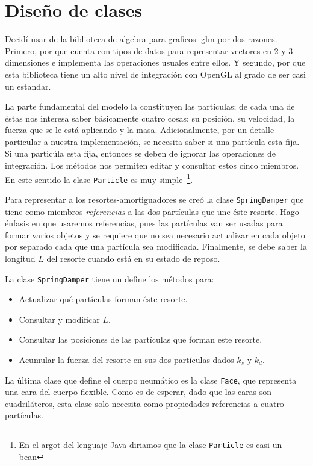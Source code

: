 \section{Diseño de clases}

Decidí usar de la biblioteca de algebra para graficos: \href{http://github.com/g-truc/glm}{glm} por dos razones.
Primero, por que cuenta con tipos de datos para representar vectores en 2 y 3 dimensiones e implementa las operaciones usuales entre ellos.
Y segundo, por que esta biblioteca tiene un alto nivel de integración con OpenGL al grado de ser casi un estandar.

La parte fundamental del modelo la constituyen las partículas; de cada una de éstas nos interesa saber básicamente cuatro cosas: su posición, su velocidad, la fuerza que se le está aplicando y la masa.
Adicionalmente, por un detalle particular a nuestra implementación, se necesita saber si una partícula esta fija.
Si una particúla esta fija, entonces se deben de ignorar las operaciones de integración.
Los métodos nos permiten editar y consultar estos cinco miembros. En este sentido la clase \texttt{Particle} es muy simple~\footnote{En el argot del lenguaje \href{http://www.java.com/en/}{Java} diriamos que la clase \texttt{Particle} es casi un \href{http://en.wikipedia.org/wiki/JavaBeans}{bean}}.

Para representar a los resortes-amortiguadores se creó la clase \texttt{SpringDamper} que tiene como miembros \emph{referencias} a las dos partículas que une éste resorte.
Hago énfasis en que usaremos referencias, pues las partículas van ser usadas para formar varios objetos y se requiere que no sea necesario actualizar en cada objeto por separado cada que una partícula sea modificada. Finalmente, se debe saber la longitud $L$ del resorte cuando está en su estado de reposo.

La clase \texttt{SpringDamper} tiene un define los métodos para:
\begin{itemize}
 \item Actualizar qué partículas forman éste resorte.
 \item Consultar y modificar $L$.
 \item Consultar las posiciones de las partículas que forman este resorte.
 \item Acumular la fuerza del resorte en sus dos partículas dados $k_s$ y $k_d$.
\end{itemize}

La última clase que define el cuerpo neumático es la clase \texttt{Face}, que representa una cara del cuerpo flexible.
Como es de esperar, dado que las caras son cuadriláteros, esta clase solo necesita como propiedades referencias a cuatro partículas.


